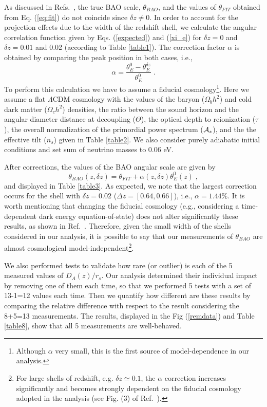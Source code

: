 \documentclass[a4paper,11pt]{article}
\begin{document}
As discussed in Refs.~\cite{Sanchez11,Carvalho,Alcaniz,deCarvalho}, the true BAO scale, $\theta_{BAO}$, and the values of $\theta_{FIT}$ obtained from Eq. (\ref{eq:fit}) do not coincide since $\delta z \neq 0$. In order to account for the projection effects due to the width of the redshift shell, we calculate the angular correlation function given by Eqs. (\ref{expected}) and (\ref{xi_e}) for $\delta z = 0$ and $\delta z = 0.01$ and 0.02 (according to Table \ref{table1}). The correction factor $\alpha$ is obtained by comparing the peak position in both cases, i.e.,
\begin{equation}
 \alpha = \frac{\theta_E^0 - \theta_E^{\delta z}}{\theta_E^0}\;.
\end{equation}
To perform this calculation we  have to assume a fiducial cosmology\footnote{Although $\alpha$ very small, this is the first source of model-dependence in our analysis.}. Here we assume a flat $\Lambda$CDM cosmology with the values of the baryon ($\Omega_bh^2$) and cold dark matter ($\Omega_ch^2$) densities, the ratio between the sound horizon and the angular diameter distance at decoupling ($\Theta$),  the optical depth to reionization ($\tau$), the overall normalization of the primordial power spectrum (${\cal{A}}_s$), and the the effective tilt ($n_s$) given in Table \ref{table2}. We also consider purely adiabatic initial conditions and set sum of neutrino masses to 0.06 eV.  

After corrections, the values of the BAO angular scale are given by 
\begin{equation}
 \theta_{BAO}(z, \delta z) = \theta_{FIT} + \alpha(z, \delta z)\theta_{E}^{0}(z)\;,
\end{equation}
and displayed in Table \ref{table3}. As expected, we note that the largest correction occurs for the shell with  $\delta z = 0.02$ ($\Delta z = [0.64, 0.66]$), i.e., $\alpha = 1.44\%$. It is worth mentioning that changing the fiducial cosmology (e.g., considering a time-dependent dark energy equation-of-state) does not alter significantly these results, as shown in Ref.~\cite{Carvalho}. Therefore, given the small width of the shells considered in our analysis, it is possible to say that our measurements of $\theta_{BAO}$ are almost cosmological model-independent\footnote{For large shells of redshift, e.g. $\delta z \simeq 0.1$, the $\alpha$ correction increases significantly and  becomes strongly dependent on the fiducial cosmology adopted in the analysis (see Fig. (3) of Ref.~\cite{Carnero}).}.

We also performed tests to validate how rare (or outlier) is each of the 5 measured values  of $D_A(z)/r_s$. Our analysis determined their individual impact by removing one of them each time, so that we performed 5 tests with a set of 13-1=12 values each time. Then we quantify how different are these results by comparing the relative difference 
with respect to the result considering the 8+5=13 measurements. The results, displayed in the Fig (\ref{remdata}) and Table \ref{table8}, show that all 5 measurements are well-behaved.
\end{document}
